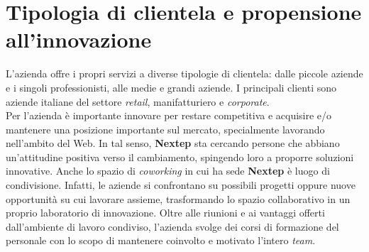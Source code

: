 \newpage
\section{Tipologia di clientela e propensione all'innovazione}
L'azienda offre i propri servizi a diverse tipologie di clientela: dalle piccole aziende e i singoli professionisti, alle medie e grandi aziende. I principali clienti sono aziende italiane del settore \textit{retail}, manifatturiero e \textit{corporate}. \\
Per l'azienda è importante innovare per restare competitiva e acquisire e/o mantenere una posizione importante sul mercato, specialmente lavorando nell'ambito del Web. In tal senso, \textbf{Nextep }sta cercando persone che abbiano un'attitudine positiva verso il cambiamento, spingendo loro a proporre soluzioni innovative. Anche lo spazio di \textit{coworking} in cui ha sede \textbf{Nextep} è luogo di condivisione. Infatti, le aziende si confrontano su possibili progetti oppure nuove opportunità su cui lavorare assieme, trasformando lo spazio collaborativo in un proprio laboratorio di innovazione. Oltre alle riunioni e ai vantaggi offerti dall'ambiente di lavoro condiviso, l'azienda svolge dei corsi di formazione del personale con lo scopo di mantenere coinvolto e motivato l'intero \textit{team}.